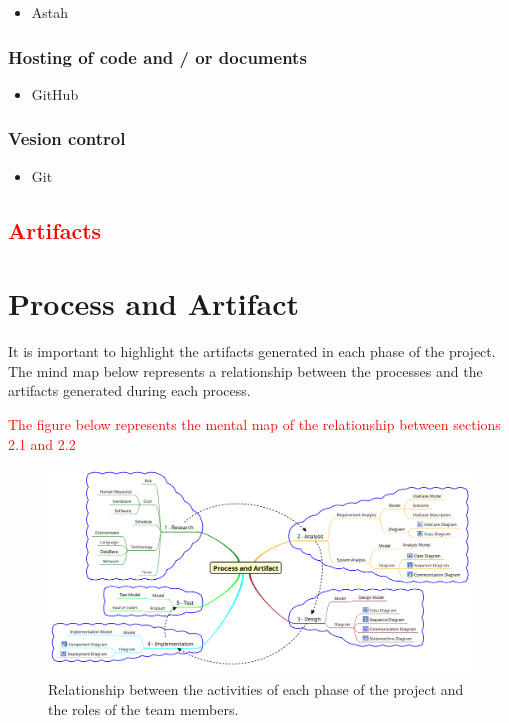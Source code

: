 \documentclass[11pt, twoside, a4paper]{book}
\begin{document}
						\begin{itemize}
							\item Astah
						\end{itemize}											
					
					\subsubsection{Hosting of code and / or documents}
        				
        				\begin{itemize}
        					\item GitHub
        				\end{itemize}
        				
					\subsubsection{Vesion control}
					
						\begin{itemize}
							\item Git
						\end{itemize}
						
			\textcolor{Red}{\section{Artifacts}}
			\section{Process and Artifact}
				
				It is important to highlight the artifacts generated in each phase of the project. The mind map below represents a relationship between the processes and the artifacts generated during each process.
				
				\begin{landscape}
				\textcolor{Red}{The figure below represents the mental map of the relationship between sections 2.1 and 2.2}
				\begin{figure}[!htb] 
					\center
   					\includegraphics[scale=0.4,bb = 0 0 1545 525]{process-and-artifact.png}
					\textcolor{Red}{\caption{Relationship between the activities of each phase of the project and the roles of the team members.}}
				\end{figure}
			\end{landscape}	
        				
\end{document}
